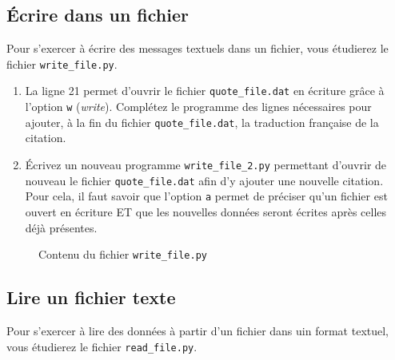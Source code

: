 
\subsection{Écrire dans un fichier}


Pour s'exercer à écrire des messages textuels dans un fichier, vous étudierez le fichier \texttt{write\_file.py}.

\begin{enumerate}

\item La ligne 21 permet d'ouvrir le fichier \texttt{quote\_file.dat} en écriture grâce
  à l'option \texttt{w} (\emph{write}).
  Complétez le programme des lignes nécessaires pour ajouter, à la fin du
  fichier \texttt{quote\_file.dat}, la traduction française de la citation.

\item   Écrivez   un  nouveau   programme   \texttt{write\_file\_2.py}
  permettant d'ouvrir  de nouveau le  fichier \texttt{quote\_file.dat}
  afin d'y ajouter une nouvelle citation. Pour cela, il faut savoir que l'option \texttt{a} permet
  de préciser qu'un fichier est ouvert en écriture ET que les nouvelles données seront écrites après celles déjà présentes. 

\end{enumerate}

\begin{figure}  
  
  \caption{Contenu du fichier \texttt{write\_file.py}}
  \label{stat_write_file}
\end{figure}

\subsection{Lire un fichier texte}


Pour  s'exercer à  lire des données à partir d'un  fichier dans uin format textuel,
vous  étudierez le  fichier \texttt{read\_file.py}.

